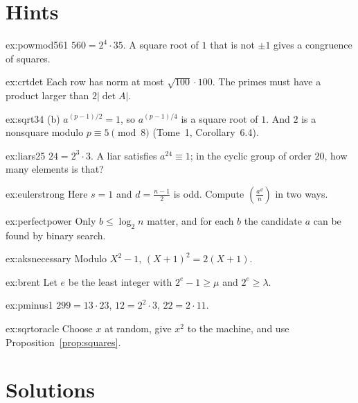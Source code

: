 \section{Hints}

\begin{hint}{ex:powmod561}
$560=2^4\cdot35$. A square root of $1$ that is not $\pm1$ gives a congruence of squares.
\end{hint}
\begin{hint}{ex:crtdet}
Each row has norm at most $\sqrt{100}\cdot100$. The primes must have a product larger than $2|\det A|$.
\end{hint}
\begin{hint}{ex:sqrt34}
(b) $a^{(p-1)/2}=1$, so $a^{(p-1)/4}$ is a square root of $1$. And $2$ is a nonsquare modulo $p\equiv5\pmod8$ (Tome~1, Corollary~6.4).
\end{hint}
\begin{hint}{ex:liars25}
$24=2^3\cdot3$. A liar satisfies $a^{24}\equiv1$; in the cyclic group of order $20$, how many elements is that?
\end{hint}
\begin{hint}{ex:eulerstrong}
Here $s=1$ and $d=\frac{n-1}2$ is odd. Compute $\left(\frac{a^d}n\right)$ in two ways.
\end{hint}
\begin{hint}{ex:perfectpower}
Only $b\le\log_2n$ matter, and for each $b$ the candidate $a$ can be found by binary search.
\end{hint}
\begin{hint}{ex:aksnecessary}
Modulo $X^2-1$, $(X+1)^2=2(X+1)$.
\end{hint}
\begin{hint}{ex:brent}
Let $e$ be the least integer with $2^e-1\ge\mu$ and $2^e\ge\lambda$.
\end{hint}
\begin{hint}{ex:pminus1}
$299=13\cdot23$, $12=2^2\cdot3$, $22=2\cdot11$.
\end{hint}
\begin{hint}{ex:sqrtoracle}
Choose $x$ at random, give $x^2$ to the machine, and use Proposition~\ref{prop:squares}.
\end{hint}

\section{Solutions}

